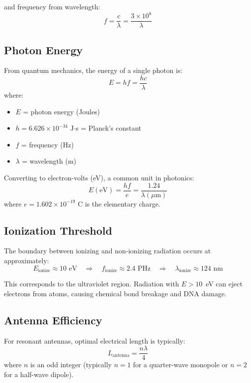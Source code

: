 and frequency from wavelength:
\begin{equation}
f = \frac{c}{\lambda} = \frac{3 \times 10^8}{\lambda}
\end{equation}

\subsection{Photon Energy}

From quantum mechanics, the energy of a single photon is:
\begin{equation}
E = h f = \frac{hc}{\lambda}
\end{equation}
where:
\begin{itemize}
\item $E$ = photon energy (Joules)
\item $h = 6.626 \times 10^{-34}$ J$\cdot$s = Planck's constant
\item $f$ = frequency (Hz)
\item $\lambda$ = wavelength (m)
\end{itemize}

Converting to electron-volts (eV), a common unit in photonics:
\begin{equation}
E(\text{eV}) = \frac{hf}{e} = \frac{1.24}{\lambda(\mu\text{m})}
\end{equation}
where $e = 1.602 \times 10^{-19}$ C is the elementary charge.

\subsection{Ionization Threshold}

The boundary between ionizing and non-ionizing radiation occurs at approximately:
\begin{equation}
E_{\text{ionize}} \approx 10 \text{ eV} \quad \Rightarrow \quad f_{\text{ionize}} \approx 2.4 \text{ PHz} \quad \Rightarrow \quad \lambda_{\text{ionize}} \approx 124 \text{ nm}
\end{equation}

This corresponds to the ultraviolet region. Radiation with $E > 10$~eV can eject electrons from atoms, causing chemical bond breakage and DNA damage.

\subsection{Antenna Efficiency}

For resonant antennas, optimal electrical length is typically:
\begin{equation}
L_{\text{antenna}} = \frac{n\lambda}{4}
\end{equation}
where $n$ is an odd integer (typically $n = 1$ for a quarter-wave monopole or $n = 2$ for a half-wave dipole).


